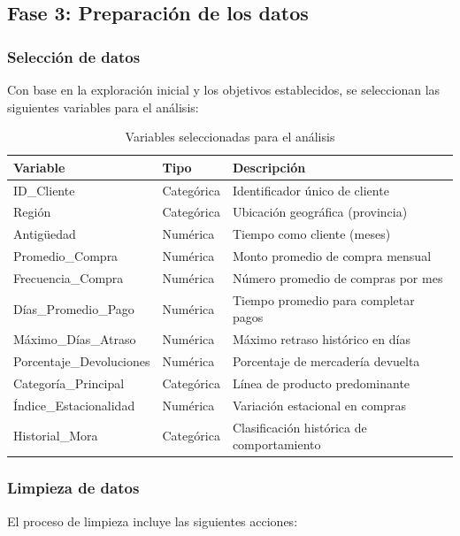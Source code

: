 \subsection{Fase 3: Preparación de los datos}
\subsubsection{Selección de datos}
Con base en la exploración inicial y los objetivos establecidos, se seleccionan las siguientes variables para el análisis:

\begin{table}[ht]
\centering
\begin{tabular}{|p{4cm}|p{3cm}|p{7cm}|}
\hline
\textbf{Variable} & \textbf{Tipo} & \textbf{Descripción} \\
\hline
ID\_Cliente & Categórica & Identificador único de cliente \\
\hline
Región & Categórica & Ubicación geográfica (provincia) \\
\hline
Antigüedad & Numérica & Tiempo como cliente (meses) \\
\hline
Promedio\_Compra & Numérica & Monto promedio de compra mensual \\
\hline
Frecuencia\_Compra & Numérica & Número promedio de compras por mes \\
\hline
Días\_Promedio\_Pago & Numérica & Tiempo promedio para completar pagos \\
\hline
Máximo\_Días\_Atraso & Numérica & Máximo retraso histórico en días \\
\hline
Porcentaje\_Devoluciones & Numérica & Porcentaje de mercadería devuelta \\
\hline
Categoría\_Principal & Categórica & Línea de producto predominante \\
\hline
Índice\_Estacionalidad & Numérica & Variación estacional en compras \\
\hline
Historial\_Mora & Categórica & Clasificación histórica de comportamiento \\
\hline
\end{tabular}
\caption{Variables seleccionadas para el análisis}
\end{table}

\subsubsection{Limpieza de datos}
El proceso de limpieza incluye las siguientes acciones:

